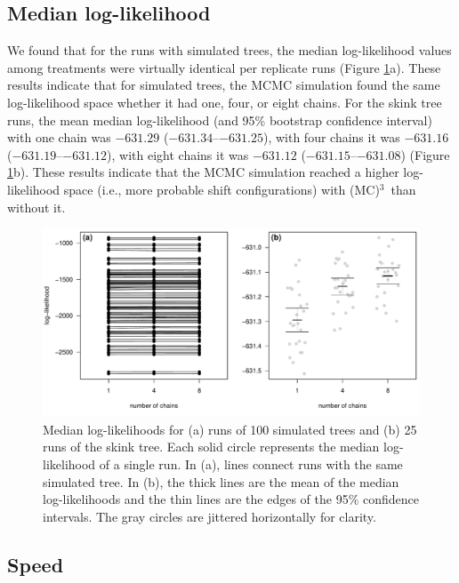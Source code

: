 \documentclass[12pt]{article}
\newcommand{\MCMCMC}{(MC)$^{3}$}
\begin{document}
\subsection*{Median log-likelihood}

We found that for the runs with simulated trees,
the median log-likelihood values among treatments
were virtually identical per replicate runs (Figure \ref{fig:median-log-like}a).
%
These results indicate that for simulated trees,
the MCMC simulation found the same log-likelihood space
whether it had one, four, or eight chains.
%
For the skink tree runs,
the mean median log-likelihood (and 95\% bootstrap confidence interval)
with one chain was $-631.29$ ($-631.34$--$-631.25$),
with four chains it was $-631.16$ ($-631.19$--$-631.12$),
with eight chains it was $-631.12$ ($-631.15$--$-631.08$)
(Figure \ref{fig:median-log-like}b).
%
These results indicate that the MCMC simulation
reached a higher log-likelihood space
(i.e., more probable shift configurations)
with \MCMCMC\ than without it.

\begin{figure}
\begin{center}
\includegraphics[width=14cm]{median-log-like.pdf}
\end{center}
\caption{Median log-likelihoods for (a) runs of 100 simulated trees
    and (b) 25 runs of the skink tree.
    Each solid circle represents the median log-likelihood of a single run.
    In (a), lines connect runs with the same simulated tree.
    In (b), the thick lines are the mean of the median log-likelihoods
    and the thin lines are the edges of the 95\% confidence intervals.
    The gray circles are jittered horizontally for clarity.}
\label{fig:median-log-like}
\end{figure}


\subsection*{Speed}
\end{document}
